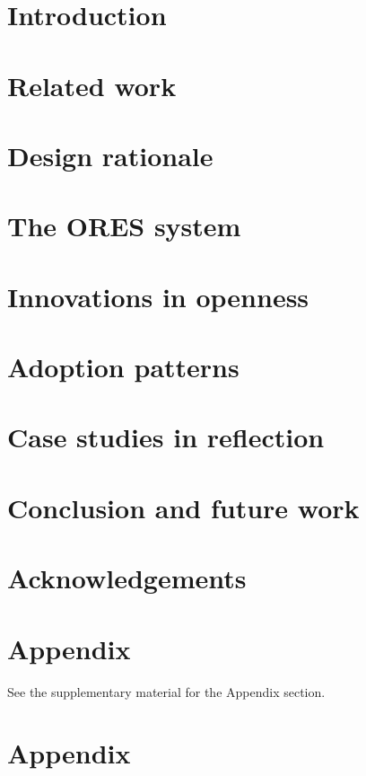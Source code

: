 \section{Introduction}
\label{sec:introduction}


\section{Related work}
\label{sec:related_work}


\section{Design rationale}
\label{sec:design_rationale}


\section{The ORES system}
\label{sec:the_ores_system}


\section{Innovations in openness}
\label{sec:innovations_in_openness}


\section{Adoption patterns}
\label{sec:adoption_patterns}


\section{Case studies in reflection}
\label{sec:case_studies}


\section{Conclusion and future work}
\label{sec:conclusions_and_future_work}


\section{Acknowledgements}
\label{sec:acknowledgements}


\section{Appendix}
See the supplementary material for the Appendix section.




\pagebreak
\appendix
\section{Appendix}
\label{sec:appendix}

